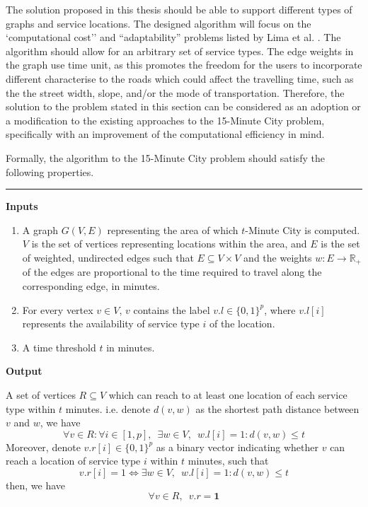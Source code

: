 The solution proposed in this thesis should be able to support different types of graphs and service locations. The designed algorithm will focus on the `computational cost'' and ``adaptability'' problems listed by Lima et al. \cite{lima_quest_2023}. The algorithm should allow for an arbitrary set of service types. The edge weights in the graph use time unit, as this promotes the freedom for the users to incorporate different characterise to the roads which could affect the travelling time, such as the the street width, slope, and/or the mode of transportation. Therefore, the solution to the problem stated in this section can be considered as an adoption or a modification to the existing approaches to the 15-Minute City problem, specifically with an improvement of the computational efficiency in mind.

Formally, the algorithm to the 15-Minute City problem should satisfy the following properties.


\rule{\textwidth}{0.4pt}

\textbf{Inputs}
\begin{enumerate}
    \item A graph $G(V,E)$ representing the area of which $t$-Minute City is computed. $V$ is the set of vertices representing locations within the area, and $E$ is the set of weighted, undirected edges such that $E\subseteq V\times V$ and the weights $w:E\rightarrow\mathbb{R}_{+}$ of the edges are proportional to the time required to travel along the corresponding edge, in minutes.
    \item For every vertex $v\in V$, $v$ contains the label $v.l\in\{0,1\}^p$, where $v.l[i]$ represents the availability of service type $i$ of the location.
    \item A time threshold $t$ in minutes.
\end{enumerate}

\textbf{Output}

A set of vertices $R\subseteq V$ which can reach to at least one location of each service type within $t$ minutes. i.e. denote $d(v,w)$ as the shortest path distance between $v$ and $w$, we have $$\forall v\in R:\forall i\in[1,p],\enspace\exists w\in V,\enspace w.l[i]=1:d(v,w)\leq t$$ Moreover, denote $v.r[i]\in\{0,1\}^p$ as a binary vector indicating whether $v$ can reach a location of service type $i$ within $t$ minutes, such that $$v.r[i]=1\iff\exists w\in V,\enspace w.l[i]=1:d(v,w)\leq t$$ then, we have $$\forall v\in R,\enspace v.r = \mathbf{1}$$

